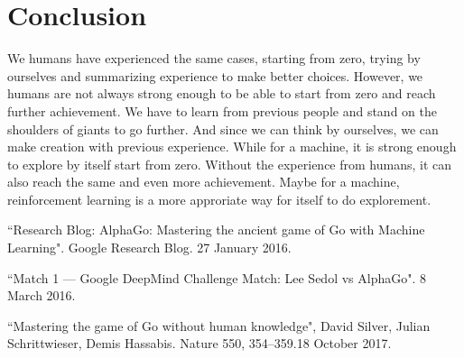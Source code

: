 \documentclass[a4paper,12pt]{article}
\begin{document}
\section{Conclusion}
We humans have experienced the same cases, starting from zero, trying by ourselves and summarizing experience to make better choices. However, we humans are not always strong enough to be able to start from zero and reach further achievement. We have to learn from previous people and stand on the shoulders of giants to go further. And since we can think by ourselves, we can make creation with previous experience. While for a machine, it is strong enough to explore by itself start from zero. Without the experience from humans, it can also reach the same and even more achievement. Maybe for a machine, reinforcement learning is a more approriate way for itself to do explorement.
\begin{thebibliography}{0}

``Research Blog: AlphaGo: Mastering the ancient game of Go with Machine Learning". Google Research Blog. 27 January 2016.

``Match 1 --– Google DeepMind Challenge Match: Lee Sedol vs AlphaGo". 8 March 2016.

``Mastering the game of Go without human knowledge", David Silver, Julian Schrittwieser, Demis Hassabis. Nature 550, 354–359.18 October 2017.
\end{thebibliography}
\end{document}
